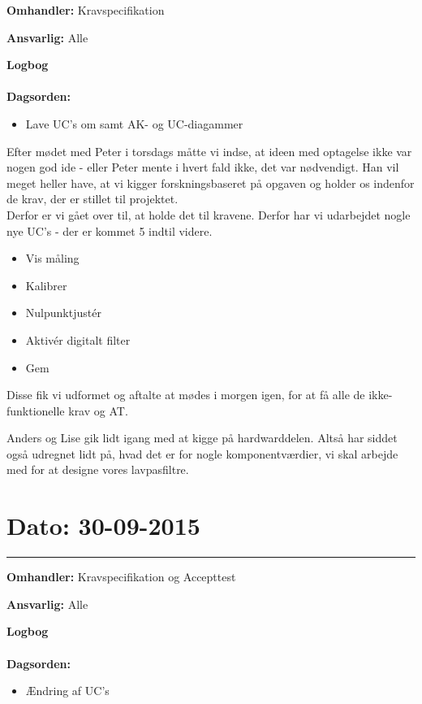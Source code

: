 \textbf{Omhandler:} Kravspecifikation 

\textbf{Ansvarlig:} Alle 

\textbf{Logbog}
\\
\\
\textbf{Dagsorden:}
\begin{itemize}
\item Lave UC's om samt AK- og UC-diagammer
\end{itemize}

Efter mødet med Peter i torsdags måtte vi indse, at ideen med optagelse ikke var nogen god ide - eller Peter mente i hvert fald ikke, det var nødvendigt. Han vil meget heller have, at vi kigger forskningsbaseret på opgaven og holder os indenfor de krav, der er stillet til projektet.\\
Derfor er vi gået over til, at holde det til kravene. Derfor har vi udarbejdet nogle nye UC's - der er kommet 5 indtil videre. 
\begin{itemize}
	\item Vis måling 
	\item Kalibrer
	\item Nulpunktjustér 
	\item Aktivér digitalt filter
	\item Gem 
\end{itemize}

Disse fik vi udformet og aftalte at mødes i morgen igen, for at få alle de ikke-funktionelle krav og AT. 

Anders og Lise gik lidt igang med at kigge på hardwarddelen. Altså har siddet også udregnet lidt på, hvad det er for nogle komponentværdier, vi skal arbejde med for at designe vores lavpasfiltre.  


	
	
\section{Dato: 30-09-2015 }
\hrule

\textbf{Omhandler:} Kravspecifikation og Accepttest  

\textbf{Ansvarlig:} Alle 

\textbf{Logbog}
\\
\\
\textbf{Dagsorden:}
\begin{itemize}
\item Ændring af UC's
\end{itemize}
	
